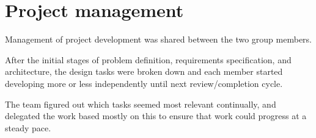 \chapter{Project management}
Management of project development was shared between the two group members.

After the initial stages of problem definition, requirements specification, and architecture, the design tasks were broken down and each member started developing more or less independently until next review/completion cycle.

The team figured out which tasks seemed most relevant continually, and delegated the work based mostly on this to ensure that work could progress at a steady pace.